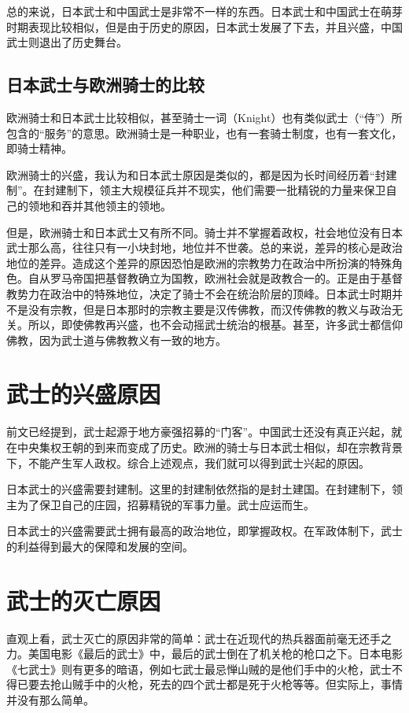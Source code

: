 \documentclass[utf8,a4paper]{ctexart}
\begin{document}
总的来说，日本武士和中国武士是非常不一样的东西。日本武士和中国武士在萌芽时期表现比较相似，但是由于历史的原因，日本武士发展了下去，并且兴盛，中国武士则退出了历史舞台。
\subsection{日本武士与欧洲骑士的比较}
欧洲骑士和日本武士比较相似，甚至骑士一词（Knight）也有类似武士（“侍”）所包含的“服务”的意思\cite{knight13}。欧洲骑士是一种职业，也有一套骑士制度，也有一套文化，即骑士精神。

欧洲骑士的兴盛，我认为和日本武士原因是类似的，都是因为长时间经历着“封建制”。在封建制下，领主大规模征兵并不现实，他们需要一批精锐的力量来保卫自己的领地和吞并其他领主的领地。

但是，欧洲骑士和日本武士又有所不同。骑士并不掌握着政权，社会地位没有日本武士那么高，往往只有一小块封地，地位并不世袭\cite{edge88}。总的来说，差异的核心是政治地位的差异。造成这个差异的原因恐怕是欧洲的宗教势力在政治中所扮演的特殊角色。自从罗马帝国把基督教确立为国教，欧洲社会就是政教合一的。正是由于基督教势力在政治中的特殊地位，决定了骑士不会在统治阶层的顶峰。日本武士时期并不是没有宗教，但是日本那时的宗教主要是汉传佛教，而汉传佛教的教义与政治无关。所以，即使佛教再兴盛，也不会动摇武士统治的根基。甚至，许多武士都信仰佛教，因为武士道与佛教教义有一致的地方\cite{liu99}。

\section{武士的兴盛原因}
前文已经提到，武士起源于地方豪强招募的“门客”。中国武士还没有真正兴起，就在中央集权王朝的到来而变成了历史。欧洲的骑士与日本武士相似，却在宗教背景下，不能产生军人政权。综合上述观点，我们就可以得到武士兴起的原因。

日本武士的兴盛需要封建制。这里的封建制依然指的是封土建国。在封建制下，领主为了保卫自己的庄园，招募精锐的军事力量。武士应运而生。

日本武士的兴盛需要武士拥有最高的政治地位，即掌握政权。在军政体制下，武士的利益得到最大的保障和发展的空间。

\section{武士的灭亡原因}
直观上看，武士灭亡的原因非常的简单：武士在近现代的热兵器面前毫无还手之力。美国电影《最后的武士》中，最后的武士倒在了机关枪的枪口之下。日本电影《七武士》则有更多的暗语，例如七武士最忌惮山贼的是他们手中的火枪，武士不得已要去抢山贼手中的火枪，死去的四个武士都是死于火枪等等。但实际上，事情并没有那么简单。
\end{document}
